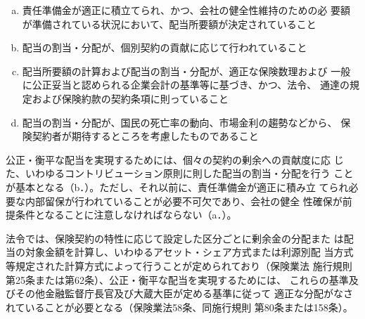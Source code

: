 \documentclass[report,gutter=10mm,fore-edge=10mm,uplatex,dvipdfmx]{jlreq}
\begin{document}
\begin{enumerate} [a.]
 \item 責任準備金が適正に積立てられ、かつ、会社の健全性維持のための必
 要額が準備されている状況において、配当所要額が決定されていること
 \item 
 配当の割当・分配が、個別契約の貢献に応じて行われていること
 \item  配当所要額の計算および配当の割当・分配が、適正な保険数理および
 一般に公正妥当と認められる企業会計の基準等に基づき、かつ、法令、
 通達の規定および保険約款の契約条項に則っていること
 \item  配当の割当・分配が、国民の死亡率の動向、市場金利の趨勢などから、
 保険契約者が期待するところを考慮したものであること
\end{enumerate}

公正・衡平な配当を実現するためには、個々の契約の剰余への貢献度に応
じた、いわゆるコントリビューション原則に則した配当の割当・分配を行う
ことが基本となる（b．）。ただし、それ以前に、責任準備金が適正に積み立
てられ必要な内部留保が行われていることが必要不可欠であり、会社の健全
性確保が前提条件となることに注意しなければならない（a．）。

法令では、保険契約の特性に応じて設定した区分ごとに剰余金の分配また
は配当の対象金額を計算し、いわゆるアセット・シェア方式または利源別配
当方式等規定された計算方式によって行うことが定められており（保険業法
施行規則第25条または第62条）、公正・衡平な配当を実現するためには、
これらの基準及びその他金融監督庁長官及び大蔵大臣が定める基準に従って
適正な分配がなされていることが必要となる（保険業法58条、同施行規則
第80条または158条）。
\end{document}
